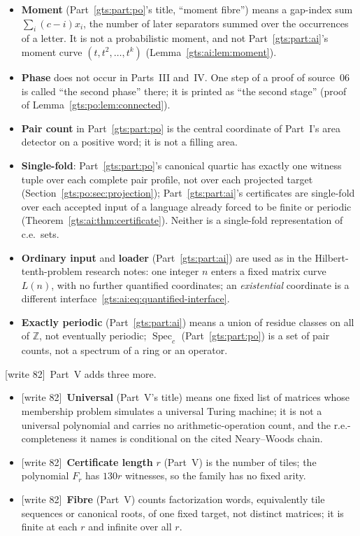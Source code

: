 \documentclass[11pt,letterpaper]{article}
\theoremstyle{definition}
\theoremstyle{remark}
\newcommand{\Z}{\mathbb Z}
\newcommand{\Spec}{\operatorname{Spec}}
\newcommand{\wtagc}{\textup{[write 82]}}
\begin{document}
\begin{itemize}
\item \textbf{Moment} (Part~\ref{gts:part:po}'s title, ``moment fibre'') means a gap-index sum $\sum_i(c-i)x_i$, the number of later separators summed over the occurrences of a letter. It is not a probabilistic moment, and not Part~\ref{gts:part:ai}'s moment curve $(t,t^2,\ldots,t^k)$ (Lemma~\ref{gts:ai:lem:moment}).
\item \textbf{Phase} does not occur in Parts~III and~IV. One step of a proof of source~06 is called ``the second phase'' there; it is printed as ``the second stage'' (proof of Lemma~\ref{gts:po:lem:connected}).
\item \textbf{Pair count} in Part~\ref{gts:part:po} is the central coordinate of Part~I's area detector on a positive word; it is not a filling area.
\item \textbf{Single-fold}: Part~\ref{gts:part:po}'s canonical quartic has exactly one witness tuple over each complete pair profile, not over each projected target (Section~\ref{gts:po:sec:projection}); Part~\ref{gts:part:ai}'s certificates are single-fold over each accepted input of a language already forced to be finite or periodic (Theorem~\ref{gts:ai:thm:certificate}). Neither is a single-fold representation of c.e.\ sets.
\item \textbf{Ordinary input} and \textbf{loader} (Part~\ref{gts:part:ai}) are used as in the Hilbert-tenth-problem research notes: one integer $n$ enters a fixed matrix curve $L(n)$, with no further quantified coordinates; an \emph{existential} coordinate is a different interface~\eqref{gts:ai:eq:quantified-interface}.
\item \textbf{Exactly periodic} (Part~\ref{gts:part:ai}) means a union of residue classes on all of $\Z$, not eventually periodic; $\Spec_c$ (Part~\ref{gts:part:po}) is a set of pair counts, not a spectrum of a ring or an operator.
\end{itemize}
\wtagc\ Part~V adds three more.
\begin{itemize}
\item \wtagc\ \textbf{Universal} (Part~V's title) means one fixed list of matrices whose membership problem simulates a universal Turing machine; it is not a universal polynomial and carries no arithmetic-operation count, and the r.e.-completeness it names is conditional on the cited Neary--Woods chain.
\item \wtagc\ \textbf{Certificate length} $r$ (Part~V) is the number of tiles; the polynomial $F_r$ has $130r$ witnesses, so the family has no fixed arity.
\item \wtagc\ \textbf{Fibre} (Part~V) counts factorization words, equivalently tile sequences or canonical roots, of one fixed target, not distinct matrices; it is finite at each $r$ and infinite over all $r$.
\end{itemize}
\end{document}
